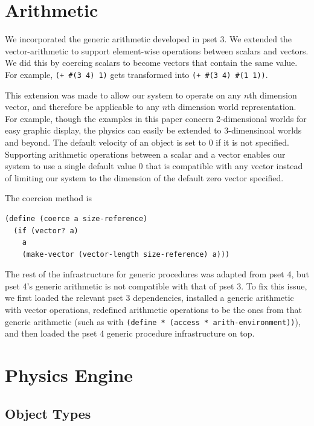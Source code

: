 \documentclass{article}
\begin{document}
\section{Arithmetic}

We incorporated the generic arithmetic developed in pset 3. We extended the
vector-arithmetic to support element-wise operations between scalars and
vectors. We did this by coercing scalars to become vectors that contain the
same value. For example, \texttt{(+ \#(3 4) 1)} gets transformed into
\texttt{(+ \#(3 4) \#(1 1))}.

This extension was made to allow our system to operate on any $n$th dimension
vector, and therefore be applicable to any $n$th dimension world
representation. For example, though the examples in this paper concern
2-dimensional worlds for easy graphic display, the physics can easily be
extended to 3-dimensinoal worlds and beyond. The default velocity of an object
is set to 0 if it is not specified. Supporting arithmetic operations between a
scalar and a vector enables our system to use a single default value 0 that is
compatible with any vector instead of limiting our system to the dimension of
the default zero vector specified.

The coercion method is
\begin{verbatim}
(define (coerce a size-reference)
  (if (vector? a)
    a
    (make-vector (vector-length size-reference) a)))
\end{verbatim}

The rest of the infrastructure for generic procedures was adapted from pset 4,
but pset 4's generic arithmetic is not compatible with that of pset 3. To fix
this issue, we first loaded the relevant pset 3 dependencies, installed a
generic arithmetic with vector operations, redefined arithmetic operations to
be the ones from that generic arithmetic (such as with \texttt{(define *
(access * arith-environment))}), and then loaded the pset 4 generic procedure
infrastructure on top.

\section{Physics Engine}
\subsection{Object Types}
\end{document}
